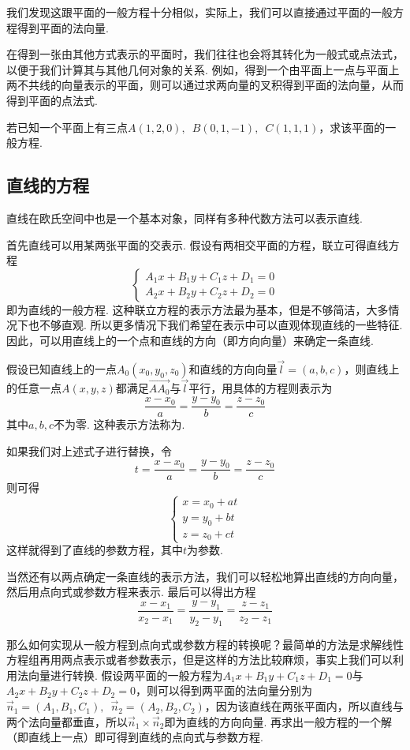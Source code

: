 我们发现这跟平面的一般方程十分相似，实际上，我们可以直接通过平面的一般方程得到平面的法向量.

在得到一张由其他方式表示的平面时，我们往往也会将其转化为一般式或点法式，以便于我们计算其与其他几何对象的关系. 例如，得到一个由平面上一点与平面上两不共线的向量表示的平面，则可以通过求两向量的叉积得到平面的法向量，从而得到平面的点法式.

\begin{example}
    若已知一个平面上有三点$A(1,2,0),\enspace B(0,1,-1),\enspace C(1,1,1)$，求该平面的一般方程.
\end{example}

\subsection{直线的方程}

直线在欧氏空间中也是一个基本对象，同样有多种代数方法可以表示直线.

首先直线可以用某两张平面的交表示. 假设有两相交平面的方程，联立可得直线方程
\[\begin{cases}
        A_1x+B_1y+C_1z+D_1=0 \\
        A_2x+B_2y+C_2z+D_2=0
    \end{cases}\]
即为直线的一般方程. 这种联立方程的表示方法最为基本，但是不够简洁，大多情况下也不够直观. 所以更多情况下我们希望在表示中可以直观体现直线的一些特征. 因此，可以用直线上的一个点和直线的方向（即方向向量）来确定一条直线.

假设已知直线上的一点$A_0(x_0,y_0,z_0)$和直线的方向向量$\vec{l}=(a,b,c)$，则直线上的任意一点$A(x,y,z)$都满足$\overrightarrow{AA_0}$与$\vec{l}$平行，用具体的方程则表示为
\[\frac{x-x_0}{a}=\frac{y-y_0}{b}=\frac{z-z_0}{c}\]
其中$a,b,c$不为零. 这种表示方法称为.

如果我们对上述式子进行替换，令\[t=\frac{x-x_0}{a}=\frac{y-y_0}{b}=\frac{z-z_0}{c}\]
则可得
\[\begin{cases}
        x=x_0+at \\
        y=y_0+bt \\
        z=z_0+ct
    \end{cases}\]
这样就得到了直线的参数方程，其中$t$为参数.

当然还有以两点确定一条直线的表示方法，我们可以轻松地算出直线的方向向量，然后用点向式或参数方程来表示. 最后可以得出方程
\[\frac{x-x_1}{x_2-x_1}=\frac{y-y_1}{y_2-y_1}=\frac{z-z_1}{z_2-z_1}\]

那么如何实现从一般方程到点向式或参数方程的转换呢？最简单的方法是求解线性方程组再用两点表示或者参数表示，但是这样的方法比较麻烦，事实上我们可以利用法向量进行转换. 假设两平面的一般方程为$A_1x+B_1y+C_1z+D_1=0$与$A_2x+B_2y+C_2z+D_2=0$，则可以得到两平面的法向量分别为$\vec{n}_1=(A_1,B_1,C_1),\enspace\vec{n}_2=(A_2,B_2,C_2)$，因为该直线在两张平面内，所以直线与两个法向量都垂直，所以$\vec{n}_1\times\vec{n}_2$即为直线的方向向量. 再求出一般方程的一个解（即直线上一点）即可得到直线的点向式与参数方程.

